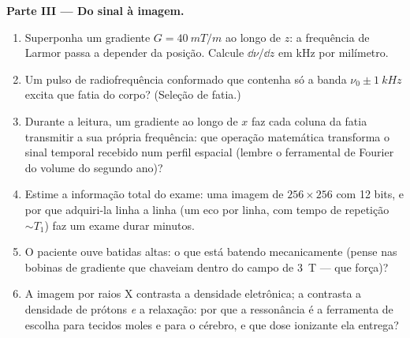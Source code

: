 \begin{problem}
\medskip\noindent\textbf{Parte III --- Do sinal à imagem.}
\begin{enumerate}[resume]
  \item Superponha um gradiente $G = \qty{40}{mT/m}$ ao longo de $z$: a
        frequência de Larmor passa a depender da posição. Calcule
        $\dd\nu/\dd z$ em kHz por milímetro.
  \item Um pulso de radiofrequência conformado que contenha só a banda $\nu_0 \pm
        \qty{1}{kHz}$ excita que fatia do corpo?
        (Seleção de fatia.)
  \item Durante a leitura, um gradiente ao longo de $x$ faz cada coluna
        da fatia transmitir a sua própria frequência: que operação
        matemática transforma o sinal temporal recebido num perfil
        espacial (lembre o ferramental de Fourier do volume do segundo
        ano)?
  \item Estime a informação total do exame: uma imagem de
        $256 \times 256$ com 12 bits, e por que adquiri-la linha a
        linha (um eco por linha, com tempo de repetição $\sim T_1$)
        faz um exame durar minutos.
  \item O paciente ouve batidas altas: o que está batendo mecanicamente
        (pense nas bobinas de gradiente que chaveiam dentro do campo de
        \qty{3}{T} --- que força)?
  \item A imagem por raios X contrasta a densidade eletrônica; a
         contrasta a densidade de prótons \emph{e}
        a relaxação: por que a ressonância é a ferramenta de escolha
        para tecidos moles e para o cérebro, e que dose ionizante ela
        entrega?
\end{enumerate}


\end{problem}
